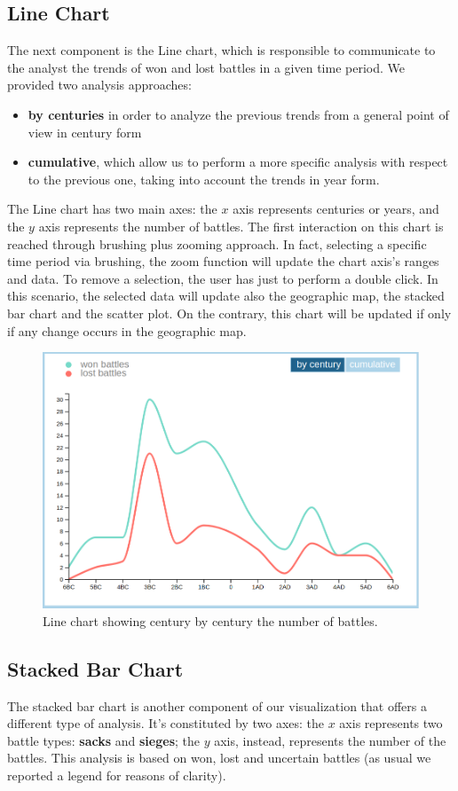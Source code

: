 \subsection{Line Chart}
The next component is the Line chart, which is responsible to communicate to the analyst the trends of won and lost battles in a given time period. We provided two analysis approaches:
\begin{itemize}
    \item \textbf{by centuries} in order to analyze the previous trends from a general point of view in century form
    \item \textbf{cumulative}, which allow us to perform a more specific analysis with respect to the previous one, taking into account the trends in year form.
\end{itemize}
The Line chart has two main axes: the $x$ axis represents centuries or years, and the $y$ axis represents the number of battles. The first interaction on this chart is reached through brushing plus zooming approach. In fact, selecting a specific time period via brushing, the zoom function will update the chart axis's ranges and data. To remove a selection, the user has just to perform a double click. In this scenario, the selected data will update also the geographic map, the stacked bar chart and the scatter plot. On the contrary, this chart will be updated if only if any change occurs in the geographic map.
\begin{figure}[h]
\centering
\includegraphics[scale=0.20]{./images/line_chart.png}
\caption{Line chart showing century by century the number of battles.}
\end{figure}

\subsection{Stacked Bar Chart}
The stacked bar chart is another component of our visualization that offers a different type of analysis. It's constituted by two axes: the $x$ axis represents two battle types: \textbf{sacks} and \textbf{sieges}; the $y$ axis, instead, represents the number of the battles. This analysis is based on won, lost and uncertain battles (as usual we reported a legend for reasons of clarity).

